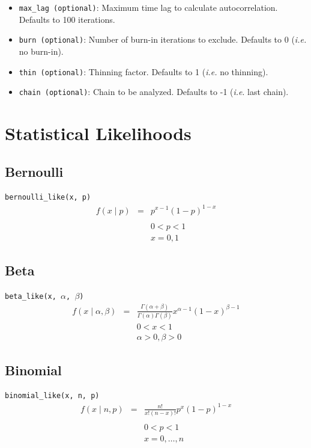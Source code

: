 \documentclass[]{book}
\begin{document}
\begin{itemize}

\item \verb=max_lag (optional)=: Maximum time lag to calculate autocorrelation. Defaults to 100 iterations.

\item \verb=burn (optional)=: Number of burn-in iterations to exclude. Defaults to 0 (\emph{i.e.} no burn-in).

\item \verb=thin (optional)=: Thinning factor. Defaults to 1 (\emph{i.e.} no thinning).

\item \verb=chain (optional)=: Chain to be analyzed. Defaults to -1 (\emph{i.e}. last chain).
\end{itemize}




\appendix

\chapter{Statistical Likelihoods}\label{chap:statistical_likelihoods}


\section*{Bernoulli}
\verb=bernoulli_like(x, p)=
\begin{eqnarray*}
f(x \mid p) &=& p^{x- 1} (1-p)^{1-x} \\
\\
&&0 < p < 1 \\
&&x=0,1
\end{eqnarray*}

\section*{Beta}
\verb=beta_like(x, =$\alpha$\verb=, =$\beta$\verb=)=
\begin{eqnarray*}
f(x \mid \alpha, \beta) &=& \frac{\Gamma(\alpha + \beta)}{\Gamma(\alpha) \Gamma(\beta)} x^{\alpha - 1} (1 - x)^{\beta - 1} \\
&&0 < x < 1 \\
&&\alpha > 0, \beta > 0
\end{eqnarray*}

\section*{Binomial}
\verb=binomial_like(x, n, p)=
\begin{eqnarray*}
f(x \mid n, p) &=& \frac{n!}{x!(n-x)!}p^x (1-p)^{1-x} \\
\\
&&0 < p < 1 \\
&&x = 0,\ldots,n
\end{eqnarray*}
\end{document}
